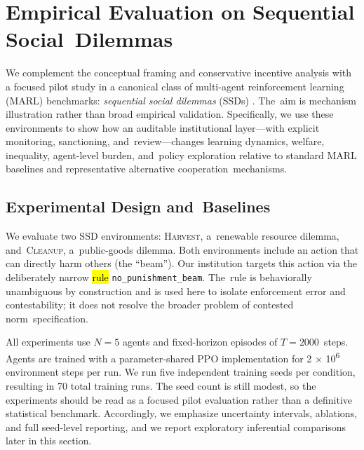 \documentclass[mca,article,accept,pdftex,oneauthor]{Definitions/mdpi}
\begin{document}
\section{Empirical Evaluation on Sequential Social~Dilemmas}
\label{sec:empirical}

We complement the conceptual framing and conservative incentive analysis with a focused pilot study in a canonical class of multi-agent reinforcement learning (MARL) benchmarks: \emph{sequential social dilemmas} (SSDs) \citep{Leibo2017SSD}. The~aim is mechanism illustration rather than broad empirical validation. Specifically, we use these environments to show how an auditable institutional layer---with explicit monitoring, sanctioning, and~review---changes learning dynamics, welfare, inequality, agent-level burden, and~policy exploration relative to standard MARL baselines and representative alternative cooperation~mechanisms.

\subsection{Experimental Design and~Baselines}

We evaluate two SSD environments: \textsc{Harvest}, a~renewable resource dilemma, and~\textsc{Cleanup}, a~public-goods dilemma. Both environments include an action that can directly harm others (the ``beam''). Our institution targets this action via the deliberately narrow \hl{rule} %
 \texttt{no\_punishment\_beam}. The~rule is behaviorally unambiguous by construction and is used here to isolate enforcement error and contestability; it does not resolve the broader problem of contested norm~specification.

All experiments use $N=5$ agents and fixed-horizon episodes of \mbox{$T=2000$ steps.} Agents are trained with a parameter-shared PPO implementation \citep{Schulman2017PPO} for 2 $\times$ 10\textsuperscript{6} environment steps per run. We run five independent training seeds per condition, resulting in 70 total training runs. The seed count is still modest, so the experiments should be read as a focused pilot evaluation rather than a definitive statistical benchmark. Accordingly, we emphasize uncertainty intervals, ablations, and full seed-level reporting, and we report exploratory inferential comparisons later in this section. %
\end{document}
